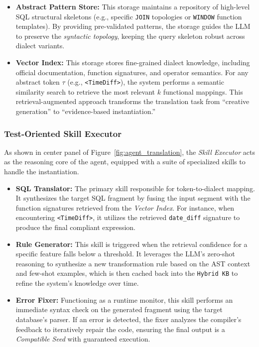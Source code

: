 \documentclass[sigconf,review,anonymous]{acmart}
\begin{document}
\begin{itemize}
    \item \textbf{Abstract Pattern Store:} This storage maintains a repository of high-level SQL structural skeletons (e.g., specific \texttt{JOIN} topologies or \texttt{WINDOW} function templates). 
    By providing pre-validated patterns, the storage guides the LLM to preserve the \textit{syntactic topology}, keeping the query skeleton robust across dialect variants.
    \item \textbf{Vector Index:} This storage stores fine-grained dialect knowledge, including official documentation, function signatures, and operator semantics. For any abstract token $\tau$ (e.g., \texttt{<TimeDiff>}), the system performs a semantic similarity search to retrieve the most relevant $k$ functional mappings. This retrieval-augmented approach transforms the translation task from ``creative generation'' to ``evidence-based instantiation.''
\end{itemize}


\subsubsection{Test-Oriented Skill Executor}%
As shown in center panel of Figure~\ref{fig:agent_translation}, the \textit{Skill Executor} acts as the reasoning core of the agent, equipped with a suite of specialized skills to handle the instantiation.



\begin{itemize}
    \item \textbf{SQL Translator:} The primary skill responsible for token-to-dialect mapping. It synthesizes the target SQL fragment by fusing the input segment with the function signatures retrieved from the \textit{Vector Index}. For instance, when encountering \texttt{<TimeDiff>}, it utilizes the retrieved \duckdb{} \texttt{date\_diff} signature to produce the final compliant expression.
    
    \item \textbf{Rule Generator:} This skill is triggered when the retrieval confidence for a specific feature falls below a threshold. It leverages the LLM's zero-shot reasoning to synthesize a new transformation rule based on the AST context and few-shot examples, which is then cached back into the \texttt{Hybrid KB} to refine the system's knowledge over time.
    
    \item \textbf{Error Fixer:} Functioning as a runtime monitor, this skill performs an immediate syntax check on the generated fragment using the target database's parser. If an error is detected, the fixer analyzes the compiler's feedback to iteratively repair the code, ensuring the final output is a \textit{Compatible Seed} with guaranteed execution.
\end{itemize}
\end{document}
